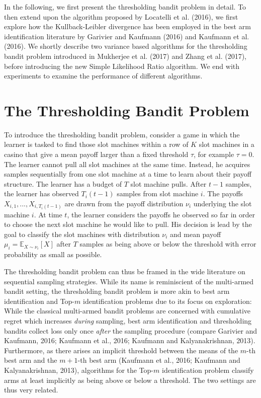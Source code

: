 \documentclass[11pt,]{article}
\begin{document}
In the following, we first present the thresholding bandit problem in
detail. To then extend upon the algorithm proposed by Locatelli et al.
(2016), we first explore how the Kullback-Leibler divergence has been
employed in the best arm identification literature by Garivier and
Kaufmann (2016) and Kaufmann et al. (2016). We shortly describe two
variance based algorithms for the thresholding bandit problem introduced
in Mukherjee et al. (2017) and Zhang et al. (2017), before introducing
the new Simple Likelihood Ratio algorithm. We end with experiments to
examine the performance of different algorithms.

\newpage

\section{\texorpdfstring{The Thresholding Bandit Problem
\label{chap:ThresholdingBanditProblem}}{The Thresholding Bandit Problem }}\label{the-thresholding-bandit-problem}

To introduce the thresholding bandit problem, consider a game in which
the learner is tasked to find those slot machines within a row of \(K\)
slot machines in a casino that give a mean payoff larger than a fixed
threshold \(\tau\), for example \(\tau = 0\). The learner cannot pull
all slot machines at the same time. Instead, he acquires samples
sequentially from one slot machine at a time to learn about their payoff
structure. The learner has a budget of \(T\) slot machine pulls. After
\(t-1\) samples, the learner has observed \(T_i(t-1)\) samples from slot
machine \(i\). The payoffs \(X_{i,1}, ..., X_{i,T_i(t-1)}\) are drawn
from the payoff distribution \(\nu_i\) underlying the slot machine
\(i\). At time \(t\), the learner considers the payoffs he observed so
far in order to choose the next slot machine he would like to pull. His
decision is lead by the goal to classify the slot machines with
distribution \(\nu_i\) and mean payoff
\(\mu_i = \mathbb{E}_{X \sim \nu_i}[X]\) after \(T\) samples as being
above or below the threshold with error probability as small as
possible.

The thresholding bandit problem can thus be framed in the wide
literature on sequential sampling strategies. While its name is
reminiscient of the multi-armed bandit setting, the thresholding bandit
problem is more akin to best arm identification and Top-\(m\)
identification problems due to its focus on exploration: While the
classical multi-armed bandit problems are concerned with cumulative
regret which increases \emph{during} sampling, best arm identification
and thresholding bandits collect loss only once \emph{after} the
sampling procedure (compare Garivier and Kaufmann, 2016; Kaufmann et
al., 2016; Kaufmann and Kalyanakrishnan, 2013). Furthermore, as there
arises an implicit threshold between the means of the \(m\)-th best arm
and the \(m+1\)-th best arm (Kaufmann et al., 2016; Kaufmann and
Kalyanakrishnan, 2013), algorithms for the Top-\(m\) identification
problem classify arms at least implicitly as being above or below a
threshold. The two settings are thus very related.
\end{document}
